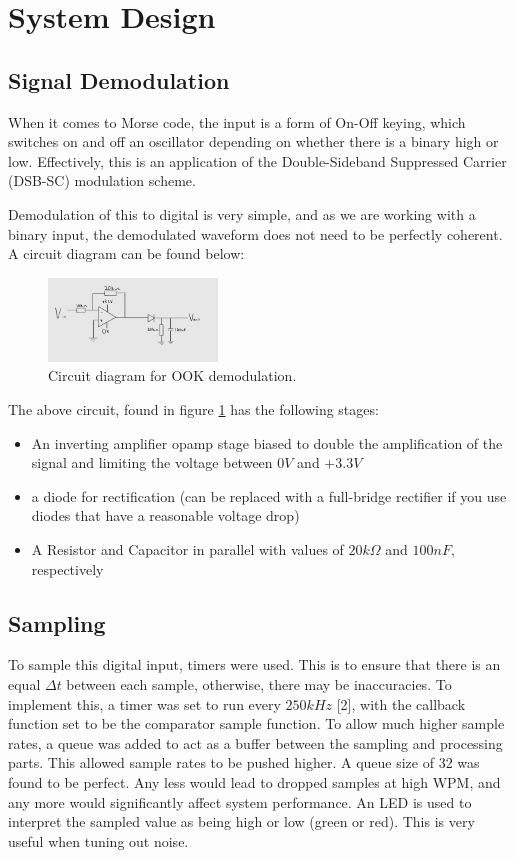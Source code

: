 \documentclass[head=13.6pt]{cce2014-design}
\begin{document}
\section{System Design}
\subsection{Signal Demodulation}
When it comes to Morse code, the input is a form of On-Off keying, which switches on and off an oscillator depending on whether there is a binary high or low. Effectively, this is an application of the Double-Sideband Suppressed Carrier (DSB-SC) modulation scheme.

Demodulation of this to digital is very simple, and as we are working with a binary input, the demodulated waveform does not need to be perfectly coherent. A circuit diagram can be found below:

\begin{figure}[h]
    \centering
    \includegraphics[width=0.4\textwidth]{images/circuit.png}
    \caption{Circuit diagram for OOK demodulation.}
    \label{whateverthehecktherefis}
\end{figure}

The above circuit, found in figure \ref{whateverthehecktherefis} has the following stages:
\begin{itemize}
\item An inverting amplifier opamp stage biased to double the amplification of the signal and limiting the voltage between $0V$ and $+3.3V$
\item a diode for rectification (can be replaced with a full-bridge rectifier if you use diodes that have a reasonable voltage drop)
\item A Resistor and Capacitor in parallel with values of $20k\Omega$ and $100nF$, respectively
\end{itemize}

\subsection{Sampling}
To sample this digital input, timers were used. This is to ensure that there is an equal $\Delta t$ between each sample, otherwise, there may be inaccuracies. To implement this, a timer was set to run every $250kHz$ [2], with the callback function set to be the comparator sample function. To allow much higher sample rates, a queue was added to act as a buffer between the sampling and processing parts. This allowed sample rates to be pushed higher. A queue size of 32 was found to be perfect. Any less would lead to dropped samples at high WPM, and any more would significantly affect system performance. An LED is used to interpret the sampled value as being high or low (green or red). This is very useful when tuning out noise.
\end{document}
